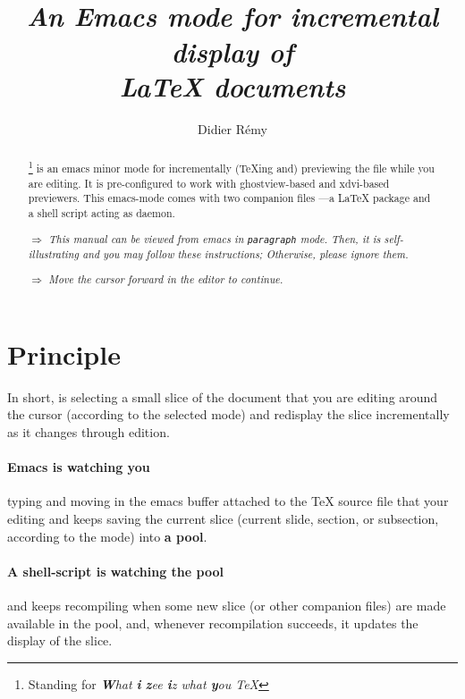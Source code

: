 \documentclass{article}
\let \whizzy \WhizzyTeX
\def \Whizzy{\textbf {\textcolor {blue}{\whizzy}}}
\def \instruction #1{\par\medskip \noindent$\Rightarrow$ {\em #1}}
\begin{document}
\pagestyle {empty}

\author {Didier R{\'e}my}

\title {
{\huge \Whizzy}
\\[1em]
{\em An {\bfseries Emacs mode} 
for incremental display of \\ 
{\bfseries {\LaTeX} documents}}
}

\maketitle   

\begin{abstract}
\def \B{\textbf}
{\whizzy}\footnote {Standing for {\em {\B W}hat {\B i} {\B z}ee
{\B i}z what {\B y}ou {\expandafter \B \TeX}}} is an emacs minor mode for
incrementally ({\TeX}ing and) previewing the file while you are editing.
%
It is pre-configured to work with ghostview-based and xdvi-based previewers.
This emacs-mode comes with two companion files ---a {\LaTeX} package and a
shell script acting as daemon. 

\instruction 
{This manual can be viewed from emacs in {\whizzy} {\tt paragraph}
mode. Then, it is self-illustrating and you may follow these instructions;
Otherwise, please ignore them.}

\instruction {Move the cursor forward in the editor to continue.}
\end{abstract}

\section {Principle} 

In short, {\sc \whizzy} is selecting a small slice of the document that 
you are editing around the cursor (according to the selected mode) 
and redisplay the slice incrementally as it changes through edition. 

\paragraph {Emacs is watching you} typing and moving in the 
emacs buffer attached to the {\TeX} source file that your editing and keeps
saving the current slice (current slide, section, or subsection, according
to the mode) into {\bf a pool}.

\paragraph {A shell-script is watching the pool}
and keeps recompiling when some new slice (or other companion files) 
are made available in the pool, and, whenever recompilation succeeds, it 
updates the display of the slice. 
\end{document}
